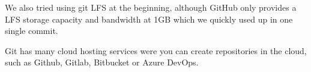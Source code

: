 We also tried using git LFS at the beginning, although GitHub only provides a LFS storage capacity and bandwidth at 1GB which we quickly used up in one single commit. 

Git has many cloud hosting services were you can create repositories in the cloud, such as Github, Gitlab, Bitbucket or Azure DevOps.